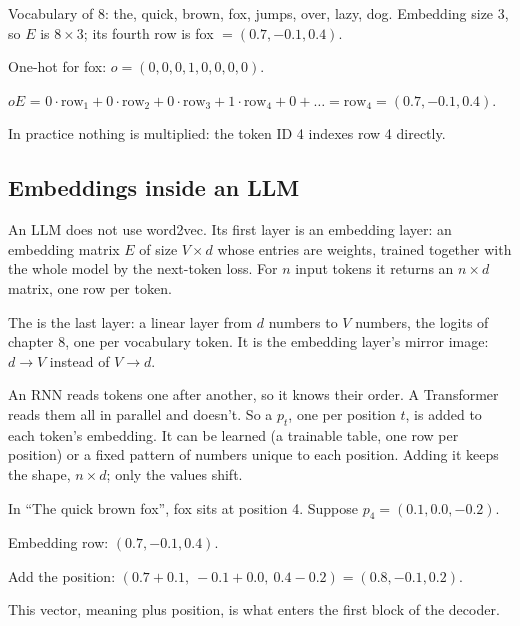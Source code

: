\begin{example}
Vocabulary of 8: the, quick, brown, fox, jumps, over, lazy, dog. Embedding size 3, so $E$ is $8 \times 3$; its fourth row is fox $= (0.7, -0.1, 0.4)$.
\begin{steps}
  \item One-hot for fox: $o = (0,0,0,1,0,0,0,0)$.
  \item $oE$ = $0\cdot\text{row}_1 + 0\cdot\text{row}_2 + 0\cdot\text{row}_3 + 1\cdot\text{row}_4 + 0 + \dots = \text{row}_4 = (0.7, -0.1, 0.4)$.
  \item In practice nothing is multiplied: the token ID 4 indexes row 4 directly.
\end{steps}
\end{example}

\subsection*{Embeddings inside an LLM}

\begin{remark}
An LLM does not use word2vec. Its first layer is an embedding layer: an embedding matrix $E$ of size $V \times d$ whose entries are weights, trained together with the whole model by the next-token loss. For $n$ input tokens it returns an $n \times d$ matrix, one row per token.
\end{remark}

\begin{definition}
The  is the last layer: a linear layer from $d$ numbers to $V$ numbers, the logits of chapter 8, one per vocabulary token. It is the embedding layer's mirror image: $d \to V$ instead of $V \to d$.
\end{definition}

\begin{definition}
An RNN reads tokens one after another, so it knows their order. A Transformer reads them all in parallel and doesn't. So a  $p_t$, one per position $t$, is added to each token's embedding. It can be learned (a trainable table, one row per position) or a fixed pattern of numbers unique to each position. Adding it keeps the shape, $n \times d$; only the values shift.
\end{definition}

\begin{example}
In ``The quick brown fox'', fox sits at position 4. Suppose $p_4 = (0.1, 0.0, -0.2)$.
\begin{steps}
  \item Embedding row: $(0.7, -0.1, 0.4)$.
  \item Add the position: $(0.7 + 0.1,\ -0.1 + 0.0,\ 0.4 - 0.2) = (0.8, -0.1, 0.2)$.
  \item This vector, meaning plus position, is what enters the first block of the decoder.
\end{steps}
\end{example}

